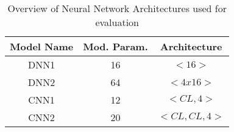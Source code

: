 \begin{table}
    \centering
    \caption{Overview of Neural Network Architectures used for evaluation}
    \begin{tabular}{|c|c|c|}
        \hline
        Model Name            & Mod. Param.         & Architecture                 \\ \hline
        \multirow{2}{*}{DNN1} & \multirow{2}{*}{16} & \multirow{2}{*}{$<16>$}      \\
        &                     &                              \\ \hline
        \multirow{2}{*}{DNN2} & \multirow{2}{*}{64} & \multirow{2}{*}{$<4x16>$}    \\
        &                     &                              \\ \hline
        \multirow{2}{*}{CNN1} & \multirow{2}{*}{12} & \multirow{2}{*}{$<CL,4>$}    \\
        &                     &                              \\ \hline
        \multirow{2}{*}{CNN2} & \multirow{2}{*}{20} & \multirow{2}{*}{$<CL,CL,4>$} \\
        &                     &                              \\ \hline
    \end{tabular}
    \label{tab:archi}
\end{table}
